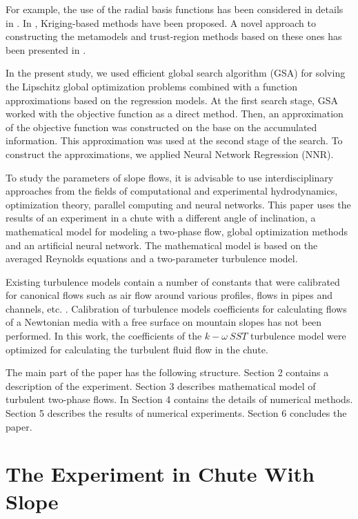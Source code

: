 \documentclass[sensors,article,submit,moreauthors,pdftex]{Definitions/mdpi}
\begin{document}
For example, the use of the radial basis functions has been considered in details in \cite{Gutmann2001,Regis2005}. In \cite{Jones1998,UrRehman2014,Ollar2017_1}, Kriging-based methods have been proposed. A novel approach to constructing the metamodels and trust-region methods based on these ones has been presented in \cite{Polynkin2012,Ollar2017_2,Toropov2018}. 

In the present study, we used efficient global search algorithm (GSA) \cite{Strongin2000,Sergeyev2013} for solving the Lipschitz global optimization problems combined with a function approximations based on the regression models. At the first search stage, GSA worked with the objective function as a direct method. Then, an approximation of the objective function was constructed on the base on the accumulated information. This approximation was used at the second stage of the search.
To construct the approximations, we applied Neural Network Regression (NNR).

To study the parameters of slope flows, it is advisable to use interdisciplinary approaches from the fields of computational and experimental hydrodynamics, optimization theory, parallel computing and neural networks. This paper uses the results of an experiment in a chute with a different angle of inclination, a mathematical model for modeling a two-phase flow, global optimization methods and an artificial neural network. The mathematical model is based on the averaged Reynolds equations and a two-parameter turbulence model. 

Existing turbulence models contain a number of constants that were calibrated for canonical flows such as air flow around various profiles, flows in pipes and channels, etc. \cite{LaunderSpalding1974, Tahry1983, LaunderMorseRodiSpaldiug1972}. Calibration of turbulence models coefficients for calculating flows of a Newtonian media with a free surface on mountain slopes has not been performed. In this work, the coefficients of the $k-\omega\ SST$ turbulence model were optimized for calculating the turbulent fluid flow in the chute.

The main part of the paper has the following structure. 
Section 2 contains a description of the experiment. Section 3 describes mathematical model of turbulent two-phase flows. In Section 4 contains the details of numerical methods. 
Section 5 describes the results of numerical experiments. 
Section 6 concludes the paper.


\section{The Experiment in Chute With Slope}
\end{document}
